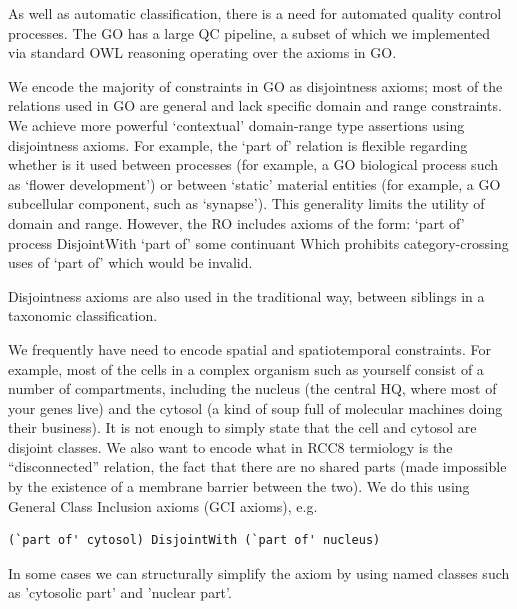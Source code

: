 \documentclass{llncs}
\begin{document}
As well as automatic classification, there is a need for automated
quality control processes. The GO has a large QC pipeline, a subset of
which we implemented via standard OWL reasoning operating over the
axioms in GO.

We encode the majority of constraints in GO as disjointness axioms;
most of the relations used in GO are general and lack specific domain
and range constraints. We achieve more powerful ‘contextual’
domain-range type assertions using disjointness axioms. For example,
the `part of' relation is flexible regarding whether is it used
between processes (for example, a GO biological process such as
‘flower development’) or between ‘static’ material entities (for
example, a GO subcellular component, such as ‘synapse’). This
generality limits the utility of domain and range. However, the RO
includes axioms of the form: `part of' process DisjointWith `part of' %
some continuant Which prohibits category-crossing uses of `part of'
which would be invalid.

Disjointness axioms are also used in the traditional way, between
siblings in a taxonomic classification.

We frequently have need to encode spatial and spatiotemporal
constraints. For example, most of the cells in a complex organism such
as yourself consist of a number of compartments, including the nucleus
(the central HQ, where most of your genes live) and the cytosol (a
kind of soup full of molecular machines doing their business). It is
not enough to simply state that the cell and cytosol are disjoint
classes. We also want to encode what in RCC8 termiology is the
``disconnected'' relation, the fact that there are no shared parts
(made impossible by the existence of a membrane barrier between the
two). We do this using General Class Inclusion axioms (GCI axioms),
e.g.  

\begin{verbatim}
(`part of' cytosol) DisjointWith (`part of' nucleus)
\end{verbatim}

In some cases we can structurally simplify the axiom by using named
classes such as 'cytosolic part' and 'nuclear part'.
\end{document}
